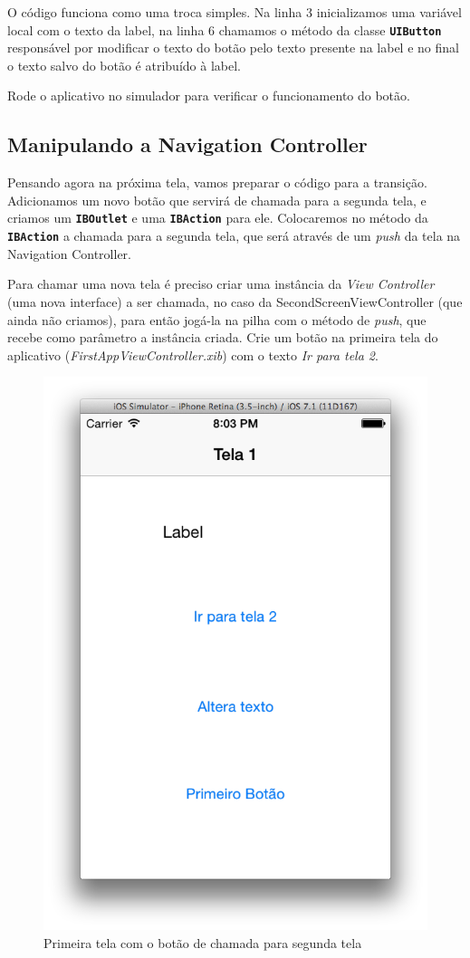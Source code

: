 \documentclass[a4paper,12pt,brazil,doubleside]{book}
\begin{document}
\begin{singlespace}
O código funciona como uma troca simples. Na linha 3 inicializamos uma variável local com o texto da label, na linha 6 chamamos o método da classe \texttt{\textbf{UIButton}} responsável por modificar o texto do botão pelo texto presente na label e no final o texto salvo do botão é atribuído à label.

Rode o aplicativo no simulador para verificar o funcionamento do botão.

\subsection{Manipulando a Navigation Controller}


Pensando agora na próxima tela, vamos preparar o código para a transição. Adicionamos um novo botão que servirá de chamada para a segunda tela, e criamos um \texttt{\textbf{IBOutlet}} e uma \texttt{\textbf{IBAction}} para ele. Colocaremos no método da \texttt{\textbf{IBAction}} a chamada para a segunda tela, que será através de um \emph{push} da tela na Navigation Controller.


Para chamar uma nova tela é preciso criar uma instância da \emph{View Controller} (uma nova interface) a ser chamada, no caso da SecondScreenViewController (que ainda não criamos), para então jogá-la na pilha com o método de \emph{push}, que recebe como parâmetro a instância criada. Crie um botão na primeira tela do aplicativo (\emph{FirstAppViewController.xib}) com o texto \emph{Ir para tela 2}.


\begin{figure}[H]
  \centering
  \includegraphics[width=.55\textwidth]{figuras/3/tela_novo_projeto_31.png}
  \caption{Primeira tela com o botão de chamada para segunda tela}
  \label{fig:a}
\end{figure}



\end{singlespace}
\end{document}

